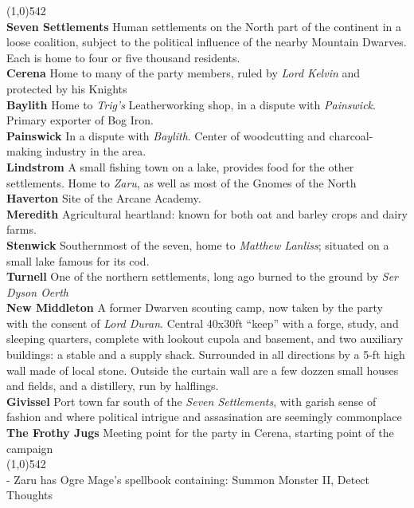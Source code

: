 \documentclass[letterpaper]{article}
\newcommand{\fullline}{\noindent\line(1,0){542} \\}
\begin{document}
\vspace{-1.75em}
\fullline
\textbf{Seven Settlements} Human settlements on the North part of the continent in a loose coalition, subject to the political influence of the nearby Mountain Dwarves. Each is home to four or five thousand residents. \\
\indent\textbf{Cerena} Home to many of the party members, ruled by \emph{Lord Kelvin} and protected by his Knights \\
\indent\textbf{Baylith} Home to \emph{Trig's} Leatherworking shop, in a dispute with \emph{Painswick}. Primary exporter of Bog Iron. \\
\indent\textbf{Painswick} In a dispute with \emph{Baylith}. Center of woodcutting and charcoal-making industry in the area. \\
\indent\textbf{Lindstrom} A small fishing town on a lake, provides food for the other settlements.  Home to \emph{Zaru}, as well as most of the Gnomes of the North \\
\indent\textbf{Haverton} Site of the Arcane Academy. \\
\indent\textbf{Meredith} Agricultural heartland: known for both oat and barley crops and dairy farms. \\
\indent\textbf{Stenwick} Southernmost of the seven, home to \emph{Matthew Lanliss}; situated on a small lake famous for its cod. \\
\textbf{Turnell} One of the northern settlements, long ago burned to the ground by \emph{Ser Dyson Oerth} \\
\textbf{New Middleton} A former Dwarven scouting camp, now taken by the party with the consent of \emph{Lord Duran}.  Central 40x30ft ``keep'' with a forge, study, and sleeping quarters, complete with lookout cupola and basement, and two auxiliary buildings: a stable and a supply shack. Surrounded in all directions by a 5-ft high wall made of local stone. Outside the curtain wall are a few dozzen small houses and fields, and a distillery, run by halflings. \\
\textbf{Givissel} Port town far south of the \emph{Seven Settlements}, with garish sense of fashion and where political intrigue and assasination are seemingly commonplace \\
\textbf{The Frothy Jugs} Meeting point for the party in Cerena, starting point of the campaign\\

\vspace{-1.75em}
\fullline
\noindent - Zaru has Ogre Mage's spellbook containing: Summon Monster II, Detect Thoughts
\end{document}
